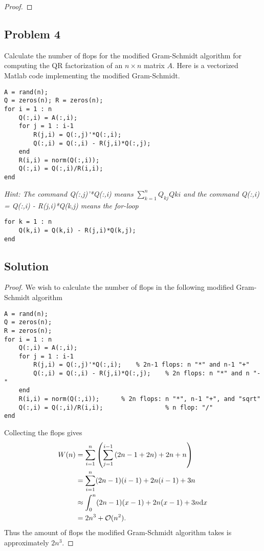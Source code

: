 \documentclass[12pt]{report}
\begin{document}
\begin{problem}
\begin{proof}
\end{proof}
\end{problem}






\begin{problem}%
\subsection*{Problem 4}

Calculate the number of flops for the modified Gram-Schmidt algorithm for computing the QR factorization of an $n \times n$ matrix $A$. Here is a vectorized Matlab code implementing the modified Gram-Schmidt.
\begin{verbatim}
A = rand(n);
Q = zeros(n); R = zeros(n);
for i = 1 : n
    Q(:,i) = A(:,i);
    for j = 1 : i-1
        R(j,i) = Q(:,j)'*Q(:,i);
        Q(:,i) = Q(:,i) - R(j,i)*Q(:,j);
    end
    R(i,i) = norm(Q(:,i));
    Q(:,i) = Q(:,i)/R(i,i);
end

\end{verbatim}
\textit{Hint: The command Q(:,j)'*Q(:,i) means $\sum_{k=1}^nQ_{kj}Q{ki}$ and the command Q(:,i) = Q(:,i) - R(j,i)*Q(k,j) means the for-loop}
\begin{verbatim}
for k = 1 : n
    Q(k,i) = Q(k,i) - R(j,i)*Q(k,j);
end
\end{verbatim}

\subsection*{Solution}
\begin{proof}

We wish to calculate the number of flops in the following modified Gram-Schmidt algorithm
\begin{verbatim}
A = rand(n);
Q = zeros(n); 
R = zeros(n);
for i = 1 : n
    Q(:,i) = A(:,i);
    for j = 1 : i-1
        R(j,i) = Q(:,j)'*Q(:,i);    % 2n-1 flops: n "*" and n-1 "+"
        Q(:,i) = Q(:,i) - R(j,i)*Q(:,j);    % 2n flops: n "*" and n "-"
    end
    R(i,i) = norm(Q(:,i));      % 2n flops: n "*", n-1 "+", and "sqrt"
    Q(:,i) = Q(:,i)/R(i,i);                 % n flop: "/"
end
\end{verbatim}

Collecting the flops gives
\begin{align*}
    W(n) &= \sum_{i=1}^n{\left(\sum_{j=1}^{i-1}{\left(2n-1 + 2n\right)} + 2n + n\right)}\\
    &= \sum_{i=1}^n (2n-1)(i-1) + 2n(i-1) + 3n\\
    &\approx \int_0^n (2n-1)(x-1) + 2n(x - 1) + 3n {\mathrm{d}} x\\
    &= 2n^3 + {\mathcal{O}}(n^2).
\end{align*}
Thus the amount of flops the modified Gram-Schmidt algorithm takes is approximately $2n^3$.



\end{proof}
\end{problem}
\end{document}
